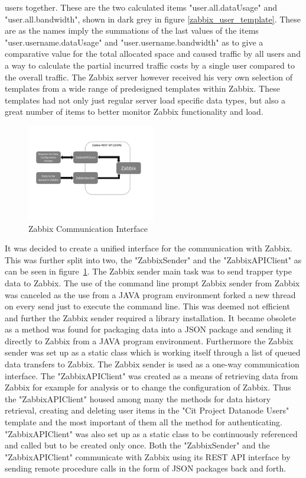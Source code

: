 users together. These are the two calculated items "user.all.dataUsage" and "user.all.bandwidth", shown in dark grey in figure \ref{zabbix_user_template}. These are as the names imply the summations of the last values of the items "user.username.dataUsage" and "user.username.bandwidth" as to give a comparative value for the total allocated space and caused traffic by all users and a  way to calculate the partial incurred traffic costs by a single user compared to the overall traffic.
	The Zabbix server however received his very own selection of templates from a wide range of predesigned templates within Zabbix. These templates had not only just regular server load specific data types, but also a great number of items to better monitor Zabbix functionality and load.
\begin{figure}[ht]
\centering
\includegraphics[width=0.5\textwidth]{img/ZabbixApiSender} 

\caption{Zabbix Communication Interface}
\label{zabbix_api_sender}
\end{figure}
	It was decided to create a unified interface for the communication with Zabbix. This was further split into two, the "ZabbixSender" and the "ZabbixAPIClient" as can be seen in figure~\ref{zabbix_api_sender}. The Zabbix sender main task was to send trapper type data to Zabbix. The use of the command line prompt Zabbix sender from Zabbix was canceled as the use from a JAVA program environment forked a new thread on every send just to execute the command line. This was deemed not efficient and further the Zabbix sender required a library installation. It became obsolete as a method was found for packaging data into a JSON package and sending it directly to Zabbix from a JAVA program environment. Furthermore the Zabbix sender was set up as a static class which is working itself through a list of queued data transfers to Zabbix. The Zabbix sender is used as a one-way communication interface. The "ZabbixAPIClient" was created as a means of retrieving data from Zabbix for example for analysis or to change the configuration of Zabbix. Thus the "ZabbixAPIClient" housed among many the methods for data history retrieval, creating and deleting user items in the "Cit Project Datanode Users" template and the most important of them all the method for authenticating. "ZabbixAPIClient" was also set up as a static class to be continuously referenced and called but to be created only once. Both the "ZabbixSender" and the "ZabbixAPIClient" communicate with Zabbix using its REST API interface by sending remote procedure calls in the form of JSON packages back and forth.
